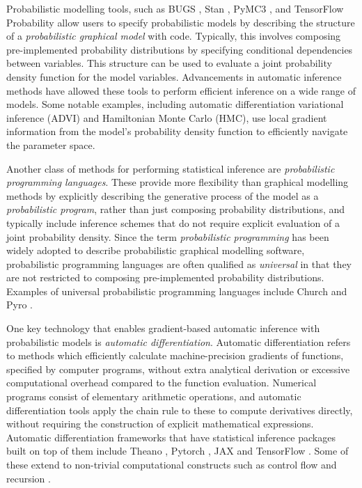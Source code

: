\documentclass[oupdraft]{sysbio_sse}
\let\cite\citep
\begin{document}
Probabilistic modelling tools, such as BUGS \cite{lunn2000winbugs}, Stan \cite{carpenter2017stan}, PyMC3 \cite{salvatier2016probabilistic}, and TensorFlow Probability \cite{dillon2017tensorflow} allow users to specify probabilistic models by describing the structure of a \textit{probabilistic graphical model} with code. Typically, this involves composing pre-implemented probability distributions by specifying conditional dependencies between variables. This structure can be used to evaluate a joint probability density function for the model variables. Advancements in automatic inference methods have allowed these tools to perform efficient inference on a wide range of models. Some notable examples, including automatic differentiation variational inference \cite{kucukelbir2017automatic} (ADVI) and Hamiltonian Monte Carlo \cite{duane1987hybrid} (HMC), use local gradient information from the model's probability density function to efficiently navigate the parameter space.

Another class of methods for performing statistical inference are \textit{probabilistic programming languages}. These provide more flexibility than graphical modelling methods by explicitly describing the generative process of the model as a \textit{probabilistic program}, rather than just composing probability distributions, and typically include inference schemes that do not require explicit evaluation of a joint probability density. Since the term \textit{probabilistic programming} has been widely adopted to describe probabilistic graphical modelling software, probabilistic programming languages are often qualified as \textit{universal} in that they are not restricted to composing pre-implemented probability distributions. Examples of universal probabilistic programming languages include Church \cite{goodman2008church} and Pyro \cite{bingham2019pyro}.

One key technology that enables gradient-based automatic inference with probabilistic models is \textit{automatic differentiation}. Automatic differentiation refers to methods which efficiently calculate machine-precision gradients of functions, specified by computer programs, without extra analytical derivation or excessive computational overhead compared to the function evaluation. Numerical programs consist of elementary arithmetic operations, and automatic differentiation tools apply the chain rule to these to compute derivatives directly, without requiring the construction of explicit mathematical expressions. Automatic differentiation frameworks that have statistical inference packages built on top of them include Theano \cite{bergstra2010theano}, Pytorch \cite{paszke2019pytorch}, JAX \cite{jax2018github} and TensorFlow \cite{abadi2016tensorflow}. Some of these extend to non-trivial computational constructs such as control flow and recursion \cite{yu2018dynamic}.
\end{document}
